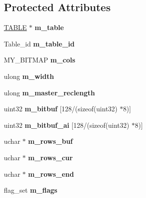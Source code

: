 \subsection*{Protected Attributes}
\begin{DoxyCompactItemize}
\item 
\mbox{\label{classOld__rows__log__event_a440fd1da41db1302224462d7cd272e5b}} 
\mbox{\hyperlink{structTABLE}{T\+A\+B\+LE}} $\ast$ {\bfseries m\+\_\+table}
\item 
\mbox{\label{classOld__rows__log__event_a777ac269e58e3b45b53013d08bb480c8}} 
Table\+\_\+id {\bfseries m\+\_\+table\+\_\+id}
\item 
\mbox{\label{classOld__rows__log__event_ae6d12d4cd4c04b9160477beaaae0317b}} 
M\+Y\+\_\+\+B\+I\+T\+M\+AP {\bfseries m\+\_\+cols}
\item 
\mbox{\label{classOld__rows__log__event_ac17e620e979b06c64a10515abfdc61bd}} 
ulong {\bfseries m\+\_\+width}
\item 
\mbox{\label{classOld__rows__log__event_a3985003897a09a3ab834c326dd8e4f56}} 
ulong {\bfseries m\+\_\+master\+\_\+reclength}
\item 
\mbox{\label{classOld__rows__log__event_aeccd0c0870a93429c86460aed373e79e}} 
uint32 {\bfseries m\+\_\+bitbuf} \mbox{[}128/(sizeof(uint32) $\ast$8)\mbox{]}
\item 
\mbox{\label{classOld__rows__log__event_ae0798eddddeebbd52af75db2f7978ecc}} 
uint32 {\bfseries m\+\_\+bitbuf\+\_\+ai} \mbox{[}128/(sizeof(uint32) $\ast$8)\mbox{]}
\item 
\mbox{\label{classOld__rows__log__event_a095b72a80b31f14449f2591950f6a539}} 
uchar $\ast$ {\bfseries m\+\_\+rows\+\_\+buf}
\item 
\mbox{\label{classOld__rows__log__event_a79bf2aea425da396985f768b18a9d59b}} 
uchar $\ast$ {\bfseries m\+\_\+rows\+\_\+cur}
\item 
\mbox{\label{classOld__rows__log__event_a0cf9ca6e632b4e9a48c3f191339f5ccb}} 
uchar $\ast$ {\bfseries m\+\_\+rows\+\_\+end}
\item 
\mbox{\label{classOld__rows__log__event_af92a71b5f118f460b75fe806f41b978d}} 
flag\+\_\+set {\bfseries m\+\_\+flags}
\end{DoxyCompactItemize}
